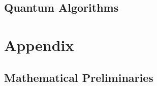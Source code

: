 \documentclass{book}
\begin{document}
\chapter{Quantum Algorithms}\label{sec:ad:quantum}
 


% 
%
% 
%
 

%
%  

\part{Appendix}

\appendix

\chapter{Mathematical Preliminaries}\label{sec:math}



\tocentryBib


%
%
%
\end{document}
